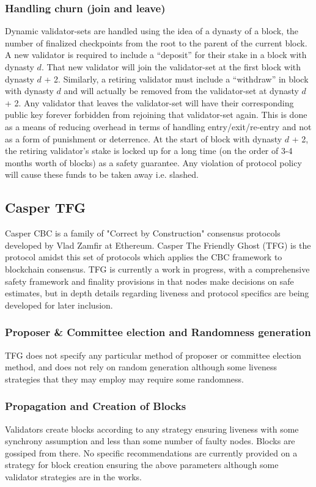 \documentclass[10pt,journal,compsoc]{IEEEtran}
\begin{document}
\subsubsection{Handling churn (join and leave)}
Dynamic validator-sets are handled using the idea of a dynasty of a block, the number of finalized checkpoints from the root to the parent of the current block. A new validator is required to include a “deposit” for their stake in a block with dynasty $d$. That new validator will join the validator-set at the first block with dynasty $d$ + 2. Similarly, a retiring validator must include a “withdraw” in block with dynasty $d$ and will actually be removed from the validator-set at dynasty $d$ + 2. Any validator that leaves the validator-set will have their corresponding public key forever forbidden from rejoining that validator-set again. This is done as a means of reducing overhead in terms of handling entry/exit/re-entry and not as a form of punishment or deterrence. At the start of block with dynasty $d$ + 2, the retiring validator’s stake is locked up for a long time (on the order of 3-4 months worth of blocks) as a safety guarantee. Any violation of protocol policy will cause these funds to be taken away i.e. slashed.

\subsection{Casper TFG}
Casper CBC is a family of "Correct by Construction" consensus protocols developed by Vlad Zamfir at Ethereum. Casper The Friendly Ghost (TFG) \cite{TFG} is the protocol amidst this set of protocols which applies the CBC framework to blockchain consensus. TFG is currently a work in progress, with a comprehensive safety framework and finality provisions in that nodes make decisions on safe estimates, but in depth details regarding liveness and protocol specifics are being developed for later inclusion. 

\subsubsection{Proposer \& Committee election and Randomness generation}
TFG does not specify any particular method of proposer or committee election method, and does not rely on random generation although some liveness strategies that they may employ may require some randomness. 

\subsubsection{Propagation and Creation of Blocks}
Validators create blocks according to any strategy ensuring liveness with some synchrony assumption and less than some number of faulty nodes. Blocks are gossiped from there. No specific recommendations are currently provided on a strategy for block creation ensuring the above parameters although some validator strategies are in the works.
\end{document}
